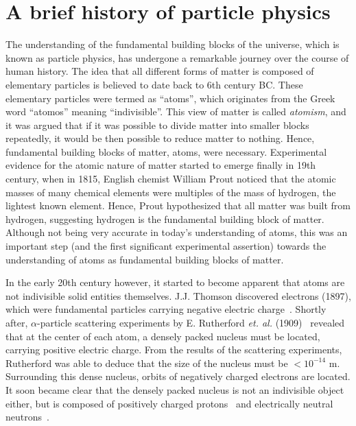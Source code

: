 \section{A brief history of particle physics}

\graphicspath{{1_TheoreticalBackground/Figures}}

The understanding of the fundamental building blocks of the universe, which is known as particle
physics, has undergone a remarkable journey over the course of human history. The idea that all 
different forms of matter is composed of elementary particles is believed to date back to 
6th century BC. These elementary particles
were termed as ``atoms'', which originates from the Greek word ``atomos'' meaning ``indivisible''.
This view of matter is called \textit{atomism}, and it was argued that if it was possible to divide
matter into smaller blocks repeatedly, it would be then possible to reduce matter to nothing.
Hence, fundamental building blocks of matter, atoms, were necessary.
Experimental evidence for the atomic nature of matter started to emerge finally
in 19th century, when in 1815, English chemist William Prout noticed that the atomic masses
of many chemical elements were multiples of the mass of hydrogen, the lightest known element.
Hence, Prout hypothesized that all matter was built from hydrogen, suggesting hydrogen is the 
fundamental building block of matter. Although not being very accurate in today's understanding of atoms,
this was an important step (and the first significant experimental assertion) towards the understanding
of atoms as fundamental building blocks of matter.   

In the early 20th century however, it started to become apparent that
atoms are not indivisible solid entities themselves. J.J. Thomson discovered electrons (1897),
which were fundamental particles carrying negative electric charge~\cite{Thomson:1897cm}.
Shortly after, $\alpha$-particle scattering experiments by E. Rutherford \textit{et. al.} (1909)~\cite{Rutherford:1911zz} 
revealed that at the center of each atom, a densely packed nucleus
must be located, carrying positive electric charge. From the results of the 
scattering experiments, Rutherford was able to deduce that the size of the nucleus must be $< 10^{-14}$ m.
Surrounding this dense nucleus, orbits of negatively charged electrons are located. It soon became clear that
the densely packed nucleus is not an indivisible object either, but is composed of positively charged 
protons~\cite{Rutherford:1919fnt}
and electrically neutral neutrons~\cite{Chadwick:1932ma}.

